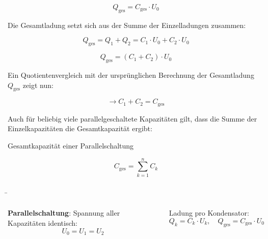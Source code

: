 \begin{frame}
{		\begin{equation*}
			Q_\mathrm{ges} = C_\mathrm{ges} \cdot U_0
		\end{equation*}
		
		Die Gesamtladung setzt sich aus der Summe der Einzelladungen zusammen:
		
		
		\begin{equation*}
			Q_\mathrm{ges} = Q_1 + Q_2 = C_1 \cdot U_0 + C_2 \cdot U_0 
		\end{equation*}
		
		
		
		\begin{equation*}
			Q_\mathrm{ges} =  (C_1 + C_2) \cdot U_0 
		\end{equation*}
		
		Ein Quotientenvergleich mit der ursprünglichen Berechnung der Gesamtladung $Q_\mathrm{ges}$ zeigt nun:
		
		
		
		\begin{equation*}
			\rightarrow C_1 + C_2 = C_\mathrm{ges}
		\end{equation*}
		
		Auch für beliebig viele parallelgeschaltete Kapazitäten gilt, dass die Summe der Einzelkapazitäten die Gesamtkapazität ergibt:
		
		
		\begin{Merksatz}{Gesamtkapazität einer Parallelschaltung}
			
			\begin{equation*}
				C_\mathrm{ges} = \sum_{k=1}^{n} C_k 
			\end{equation*}
			
		\end{Merksatz}
		
	}
	
	
	
	\b{
		\begin{columns}
			\vspace*{-110pt}
			
			\textbf{Parallelschaltung}: Spannung aller Kapazitäten identisch: \\
			
			\vspace*{-10pt}
			\begin{equation*}
				U_0 = U_1 = U_2	
			\end{equation*}
			
			Ladung pro Kondensator:
			\begin{equation*}
				Q_k = C_k \cdot U_k, \quad Q_\mathrm{ges} = C_\mathrm{ges} \cdot U_0
			\end{equation*}
			

\end{columns}}
\end{frame}
